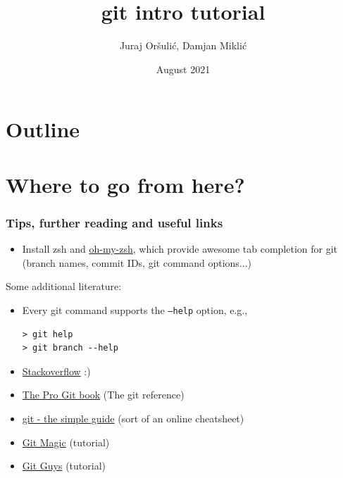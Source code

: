 \documentclass[xcolor=dvipsnames]{beamer}%
\title[git basics]
{git intro tutorial}
\author[Or\v{s}uli\'{c}, Mikli\'{c}]{Juraj Or\v{s}uli\'{c}, Damjan Mikli\'{c}}
\institute[Romb]{Romb Technologies}
\date[]{August 2021}
\begin{document}

\begin{frame}
	\titlepage
\end{frame}

\section*{Outline}
\begin {frame}
	\tableofcontents
\end{frame}












\section{Where to go from here?}

\begin{frame}[fragile]

\frametitle{Tips, further reading and useful links}

	\begin{itemize}	
	\item Install zsh and \href{http://ohmyz.sh/}{oh-my-zsh}, which provide awesome tab completion for git (branch names, commit IDs, git command options...)
	\end{itemize}
	
Some additional literature:
	\begin{itemize}
	\item Every git command supports the \texttt{--help} option, e.g.,
	\begin{verbatim}
> git help
> git branch --help
	\end{verbatim}
	\item \href{http://stackoverflow.com/questions/tagged/git}{Stackoverflow} :)
	\item \href{https://git-scm.com/book/en/v2}{The Pro Git book} (The git reference)
	\item \href{http://rogerdudler.github.io/git-guide/}{git - the simple guide} (sort of an online cheatsheet)
	\item \href{http://www-cs-students.stanford.edu/~blynn/gitmagic/}{Git Magic} (tutorial) 
	\item \href{http://www.gitguys.com/}{Git Guys} (tutorial)
	\end{itemize}
	
\end{frame}
\end{document}
